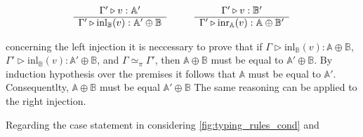 \begin{figure} [H]
  \begin{equation*}
  \begin{split}
  \begin{aligned}
  & \hspace{15pt}
  \begin{minipage}[t]{0.3\textwidth}
  $\begin{array}{c}
     \Gamma' \triangleright v: \mathbb{A'} \\
    \hline
   \Gamma' \triangleright \text{inl}_{\mathbb{B}}(v):  \mathbb{A'} \oplus \mathbb{B}
\end{array}
$
  \end{minipage} 
 \hspace{20pt}
\begin{minipage}[t]{0.3\textwidth}
$\begin{array}{c}
      \Gamma' \triangleright v:  \mathbb{B'} \\
    \hline
   \Gamma' \triangleright \text{inr}_{\mathbb{A}}(v): \mathbb{A} \oplus \mathbb{B'}
\end{array}
$ \end{minipage}
  \end{aligned}
  \end{split}
  \end{equation*}
  \end{figure}

concerning the left injection it is neccessary to prove that if $\Gamma \triangleright \text{inl}_{\mathbb{B}}(v):  \mathbb{A} \oplus \mathbb{B}$, $\Gamma' \triangleright \text{inl}_{\mathbb{B}}(v):  \mathbb{A'} \oplus \mathbb{B}$, and $\Gamma \simeq_{\pi} \Gamma' $, then $\mathbb{A} \oplus \mathbb{B} $ must be equal to $\mathbb{A}'\oplus \mathbb{B}$. By induction hypothesis over the premises it follows that $\mathbb{A} $ must be equal to $\mathbb{A}'$. Consequentlty, $\mathbb{A}\oplus \mathbb{B}$ must be equal $\mathbb{A'}\oplus \mathbb{B}$  The same reasoning can be applied to the right injection.

Regarding the case statement in considering \autoref{fig:typing_rules_cond} and  

